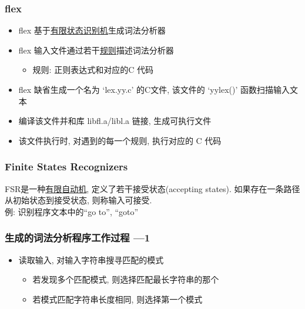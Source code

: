 \documentclass[compress]{beamer}
\begin{document}
\begin{frame}
\frametitle{flex}

\begin{itemize}
  \item {flex} 基于\uline{有限状态识别机}生成词法分析器

  \item {flex} 输入文件通过若干\uline{规则}描述词法分析器
    \begin{itemize}
    \item 规则: 正则表达式和对应的C 代码
    \end{itemize}

\item {flex} 缺省生成一个名为 `lex.yy.c' 的C文件, 
  该文件的 `yylex()' 函数扫描输入文本

\item 编译该文件并和库 \alert{libfl.a/libl.a} 链接, 生成可执行文件

\item 该文件执行时, 对遇到的每一个规则, 执行对应的 C 代码
\end{itemize}

\end{frame}


\begin{frame}
\frametitle{Finite States Recognizers}

FSR是一种\uline{有限自动机}, 定义了若干接受状态(accepting states).
如果存在一条路径从初始状态到接受状态, 则称输入可接受.\\
例: 识别程序文本中的``go to'', ``goto''\\[2ex]

\end{frame}

\begin{frame}
\frametitle{生成的词法分析程序工作过程 ---1 }
\begin{itemize}
\item 读取输入, 对输入字符串搜寻匹配的模式
    \begin{itemize}
    \item 若发现多个匹配模式, 则选择匹配最长字符串的那个
    \item 若模式匹配字符串长度相同, 则选择第一个模式
    \end{itemize}
\end{itemize}

\end{frame}
\end{document}
